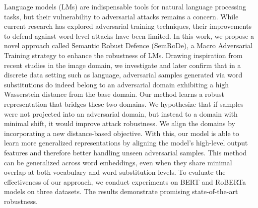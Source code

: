 Language models (LMs) are indispensable tools for natural language processing tasks, but their vulnerability to adversarial attacks remains a concern. While current research has explored adversarial training techniques, their improvements to defend against word-level attacks have been limited. In this work, we propose a novel approach called Semantic Robust Defence (SemRoDe), a Macro Adversarial Training strategy to enhance the robustness of LMs. Drawing inspiration from recent studies in the image domain, we investigate and later confirm that in a discrete data setting such as language, adversarial samples generated via word substitutions do indeed belong to an adversarial domain exhibiting a high Wasserstein distance from the base domain. Our method learns a robust representation that bridges these two domains. We hypothesize that if samples were not projected into an adversarial domain, but instead to a domain with minimal shift, it would improve attack robustness. We align the domains by incorporating a new distance-based objective. With this, our model is able to learn more generalized representations by aligning the model's high-level output features and therefore better handling unseen adversarial samples. This method can be generalized across word embeddings, even when they share minimal overlap at both vocabulary and word-substitution levels. To evaluate the effectiveness of our approach, we conduct experiments on BERT and RoBERTa models on three datasets. The results demonstrate promising state-of-the-art robustness.